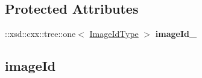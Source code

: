 \subsection*{Protected Attributes}
\begin{DoxyCompactItemize}
\item 
\hypertarget{classopenstack_1_1xml_1_1Rebuild_a2faba98efa19342e47f0d7b09c25b280}{
::xsd::cxx::tree::one$<$ \hyperlink{classopenstack_1_1xml_1_1Rebuild_a8896fc0d560d689eedce7af71136c4dc}{ImageIdType} $>$ {\bfseries imageId\_\-}}
\label{classopenstack_1_1xml_1_1Rebuild_a2faba98efa19342e47f0d7b09c25b280}

\end{DoxyCompactItemize}
\subsection*{imageId}
\label{_amgrp3f634a414d187368bc41638f11235cdc}
